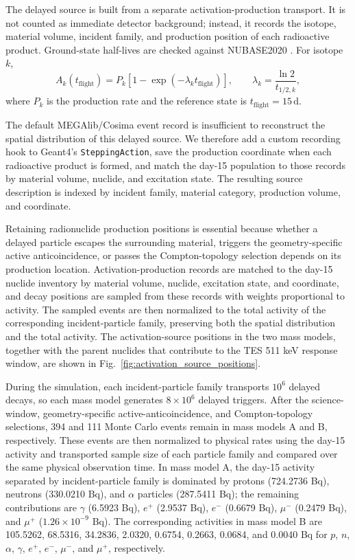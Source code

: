 \documentclass[11pt]{article}
\begin{document}
The delayed source is built from a separate activation-production transport. It
is not counted as immediate detector background; instead, it records the isotope,
material volume, incident family, and production position of each radioactive
product. Ground-state half-lives are checked against NUBASE2020
\cite{Kondev2021NUBASE}. For isotope $k$,
\begin{equation}
  A_k(t_{\mathrm{flight}})=P_k\left[1-\exp(-\lambda_k t_{\mathrm{flight}})\right],
  \qquad \lambda_k=\frac{\ln2}{t_{1/2,k}},
\end{equation}
where $P_k$ is the production rate and the reference state is
$t_{\mathrm{flight}}=15\,\mathrm{d}$.

The default MEGAlib/Cosima event record is insufficient to reconstruct the
spatial distribution of this delayed source. We therefore add a custom recording
hook to Geant4's \texttt{SteppingAction}, save the production coordinate when each
radioactive product is formed, and match the day-15 population to those records by
material volume, nuclide, and excitation state. The resulting source description
is indexed by incident family, material category, production volume, and
coordinate.

Retaining radionuclide production positions is essential because whether a
delayed particle escapes the surrounding material, triggers the geometry-specific
active anticoincidence, or passes the Compton-topology selection depends on its production
location. Activation-production records are matched to the day-15 nuclide
inventory by material volume, nuclide, excitation state, and coordinate, and decay
positions are sampled from these records with weights proportional to activity.
The sampled events are then normalized to the total activity of the corresponding
incident-particle family, preserving both the spatial distribution and the total
activity. The activation-source positions in the two mass models, together with
the parent nuclides that contribute to the TES 511 keV response window, are shown
in Fig.~\ref{fig:activation_source_positions}.

During the simulation, each incident-particle family transports $10^6$ delayed
decays, so each mass model generates $8\times10^6$ delayed triggers. After the
science-window, geometry-specific active-anticoincidence, and Compton-topology selections, 394 and 111
Monte Carlo events remain in mass models A and B, respectively. These events are
then normalized to physical rates using the day-15 activity and transported sample
size of each particle family and compared over the same physical observation time.
In mass model A, the day-15 activity separated
by incident-particle family is dominated by protons (724.2736 Bq), neutrons
(330.0210 Bq), and $\alpha$ particles (287.5411 Bq); the remaining contributions
are $\gamma$ (6.5923 Bq), $e^+$ (2.9537 Bq), $e^-$ (0.6679 Bq), $\mu^-$
(0.2479 Bq), and $\mu^+$ ($1.26\times10^{-9}$ Bq). The corresponding activities
in mass model B are 105.5262, 68.5316, 34.2836, 2.0320, 0.6754, 0.2663, 0.0684,
and 0.0040 Bq for $p$, $n$, $\alpha$, $\gamma$, $e^+$, $e^-$, $\mu^-$, and
$\mu^+$, respectively.
\end{document}
